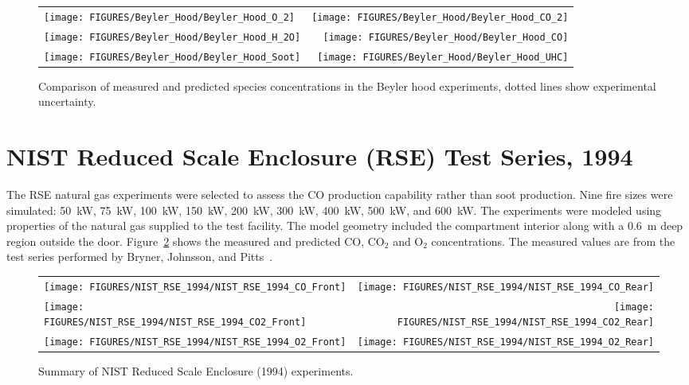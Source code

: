 \newpage

\begin{figure}[p]
\begin{tabular*}{\textwidth}{l@{\extracolsep{\fill}}r}
\texttt{[image: FIGURES/Beyler\_Hood/Beyler\_Hood\_O\_2]} &
\texttt{[image: FIGURES/Beyler\_Hood/Beyler\_Hood\_CO\_2]} \\
\texttt{[image: FIGURES/Beyler\_Hood/Beyler\_Hood\_H\_2O]} &
\texttt{[image: FIGURES/Beyler\_Hood/Beyler\_Hood\_CO]} \\
\texttt{[image: FIGURES/Beyler\_Hood/Beyler\_Hood\_Soot]} &
\texttt{[image: FIGURES/Beyler\_Hood/Beyler\_Hood\_UHC]} \\
\end{tabular*}
\caption[Summary of gas species predictions, Beyler hood experiments.]
{Comparison of measured and predicted species concentrations in the Beyler hood experiments,
dotted lines show experimental uncertainty.}
\label{Beyler_Species}
\end{figure}

\clearpage

\section{NIST Reduced Scale Enclosure (RSE) Test Series, 1994}

The RSE natural gas experiments were selected to assess the CO production capability rather than soot production.
Nine fire sizes were simulated: 50~kW, 75~kW, 100~kW, 150~kW, 200~kW, 300~kW, 400~kW,
500~kW, and 600~kW.  The experiments were modeled using properties of the natural gas supplied to the test facility.
The model geometry included the compartment interior along with a 0.6~m deep region outside the door.
Figure~\ref{NIST_RSE_1994} shows the measured and predicted CO, CO$_2$ and O$_2$ concentrations.  The measured values are
from the test series performed by Bryner, Johnsson, and Pitts~\cite{Bryner:1}.

\newpage

\begin{figure}[p]
\begin{tabular*}{\textwidth}{l@{\extracolsep{\fill}}r}
\texttt{[image: FIGURES/NIST\_RSE\_1994/NIST\_RSE\_1994\_CO\_Front]} &
\texttt{[image: FIGURES/NIST\_RSE\_1994/NIST\_RSE\_1994\_CO\_Rear]} \\
\texttt{[image: FIGURES/NIST\_RSE\_1994/NIST\_RSE\_1994\_CO2\_Front]} &
\texttt{[image: FIGURES/NIST\_RSE\_1994/NIST\_RSE\_1994\_CO2\_Rear]} \\
\texttt{[image: FIGURES/NIST\_RSE\_1994/NIST\_RSE\_1994\_O2\_Front]} &
\texttt{[image: FIGURES/NIST\_RSE\_1994/NIST\_RSE\_1994\_O2\_Rear]}
\end{tabular*}
\caption[Summary of NIST Reduced Scale Enclosure (1994) experiments.]{Summary of NIST Reduced Scale Enclosure (1994) experiments.}
\label{NIST_RSE_1994}
\end{figure}


